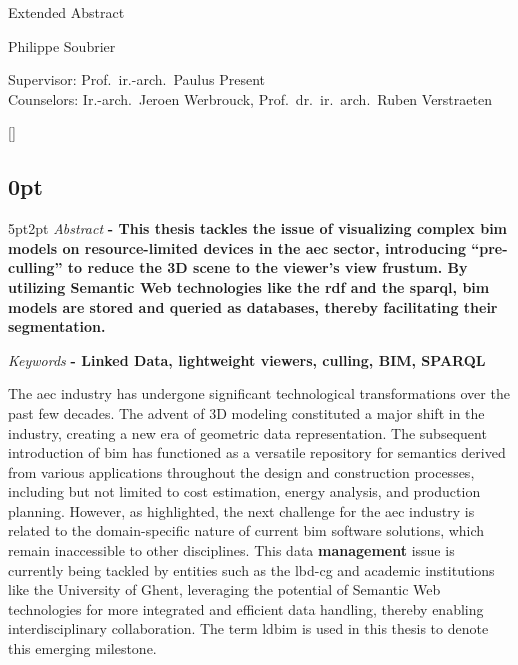 \begin{center}
    \sffamily
    \huge Extended Abstract

    \Large Philippe Soubrier

    \normalsize
    Supervisor: Prof.\ ir.-arch.\ Paulus Present\\
    Counselors: Ir.-arch.\ Jeroen Werbrouck, Prof.\ dr.\ ir.\ arch.\ Ruben Verstraeten
\end{center}
\begin{refsection}
    []{}
    \begin{multicols}{2}
        \small
        \titlespacing\subsection{0pt}{5pt}{2pt}
        \emph{Abstract} \textbf{
            - This thesis tackles the issue of visualizing complex \ac{bim} models on resource-limited devices in the \ac{aec} sector, introducing \enquote{pre-culling} to reduce the 3D scene to the viewer's view frustum. By utilizing Semantic Web technologies like the \ac{rdf} and the \ac{sparql}, \ac{bim} models are stored and queried as databases, thereby facilitating their segmentation.
        }

        \emph{Keywords} \textbf{
            - Linked Data, lightweight viewers, culling, BIM, SPARQL
        }

        The \ac{aec} industry has undergone significant technological transformations over the past few decades. The advent of 3D modeling constituted a major shift in the industry, creating a new era of geometric data representation. The subsequent introduction of \ac{bim} has functioned as a versatile repository for semantics derived from various applications throughout the design and construction processes, including but not limited to cost estimation, energy analysis, and production planning. However, as \cite{Werbrouck2018} highlighted, the next challenge for the \ac{aec} industry is related to the domain-specific nature of current \ac{bim} software solutions, which remain inaccessible to other disciplines. This data \textbf{management} issue is currently being tackled by entities such as the \ac{lbd-cg} and academic institutions like the University of Ghent, leveraging the potential of Semantic Web technologies for more integrated and efficient data handling, thereby enabling interdisciplinary collaboration. The term \ac{ldbim} is used in this thesis to denote this emerging milestone.


\end{multicols}
\end{refsection}
